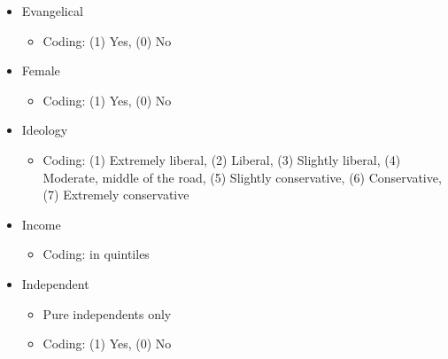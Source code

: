 \documentclass[12pt]{article}
\begin{document}
\begin{appendices}
\begin{refsection}
\begin{itemize}
	\item Evangelical
		\begin{itemize}
			\item Coding: (1) Yes, (0) No
		\end{itemize}
		
	\item Female
		\begin{itemize}
			\item Coding: (1) Yes, (0) No
		\end{itemize}
		
	\item Ideology 
		\begin{itemize}
			\item Coding: (1) Extremely liberal, (2) Liberal, (3) Slightly liberal, (4) Moderate, middle of the road, (5) Slightly conservative, (6) Conservative, (7) Extremely conservative 
		\end{itemize}
		
	\item Income
		\begin{itemize}
			\item Coding: in quintiles
		\end{itemize}
		
	\item Independent  
		\begin{itemize}
			\item Pure independents only
			\item Coding: (1) Yes, (0) No
		\end{itemize}
		

\end{itemize}
\end{refsection}
\end{appendices}
\end{document}
